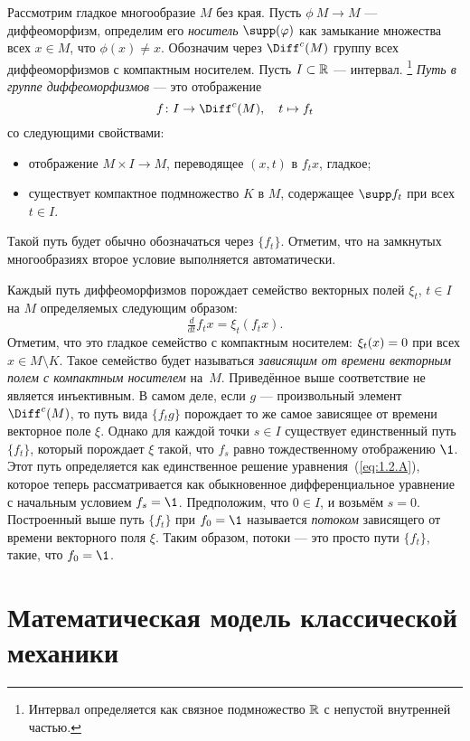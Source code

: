 Рассмотрим гладкое многообразие $M$ без края.
Пусть $\phi\: M \to M$ — диффеоморфизм, определим его \emph{носитель} \index[symb]{$\supp(\phi)$}$\supp(\phi)$ как замыкание множества всех $x \in M$, что $\phi(x) \ne x$.
Обозначим через $\Diff^c (M)$ группу всех диффеоморфизмов с компактным носителем.
Пусть $I \subset \mathbb{R}$ — интервал.%
\footnote{Интервал определяется как связное подмножество $\mathbb{R}$ с непустой внутренней частью.}
\emph{Путь в группе диффеоморфизмов} — это отображение 
\[f\: I \to \Diff^c (M),\quad t \mapsto f_t\]
со следующими свойствами:
\begin{itemize}
\item отображение $M \times I \to M$, переводящее $(x, t)$ в $f_t x$, гладкое;
\item существует компактное подмножество $K$ в $M$, содержащее $\supp f_t$ при всех $t \in I$.
\end{itemize}
Такой путь будет обычно обозначаться через $\{f_t\}$.
Отметим, что на замкнутых многообразиях второе условие выполняется автоматически.

Каждый путь диффеоморфизмов порождает семейство векторных полей $\xi_t$, $t \in I$ на $M$ определяемых следующим образом: 
\begin{equation}\tfrac{d}{dt} f_t x = \xi_t (f_t x).
\label{eq:1.2.A}
\end{equation}
Отметим, что это гладкое семейство с компактным носителем: $\xi_t (x) \z= 0$ при всех $x \in M \setminus K$.
Такое семейство будет называться \textit{зависящим от времени векторным полем с компактным носителем} на~$M$.
Приведённое выше соответствие не является инъективным.
В самом деле, если $g$ — произвольный элемент $\Diff^c (M)$, то путь вида $\{f_t g\}$ порождает то же самое зависящее от времени векторное поле $\xi$.
Однако для каждой точки $s \in I$ существует единственный путь $\{f_t\}$, который 
порождает $\xi$ такой, что $f_s$ равно тождественному отображению $\1$.
Этот путь определяется как единственное решение уравнения~(\ref{eq:1.2.A}), которое теперь рассматривается как обыкновенное дифференциальное уравнение с начальным условием $f_s = \1$.
Предположим, что $0 \in I$, и возьмём $s = 0$.
Построенный выше путь $\{f_t\}$ при $f_0 = \1$ называется \emph{потоком} зависящего от времени векторного поля $\xi$.
Таким образом, потоки — это просто пути $\{f_t\}$, такие, что $f_0 = \1$.

\section[Классическая механика]{Математическая модель классической механики}

